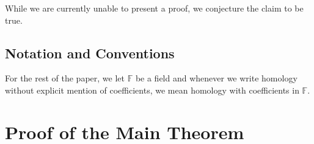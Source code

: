 \documentclass{amsart}
\theoremstyle{plain}
\theoremstyle{definition}
\begin{document}
While we are currently unable to present a proof, we conjecture the claim to be true. 


\subsection*{Notation and Conventions}
For the rest of the paper, we let $\mathbb{F}$ be a field and whenever we write homology without explicit mention of coefficients, we mean homology with coefficients in $\mathbb{F}$.

\section{Proof of the Main Theorem}
\end{document}

